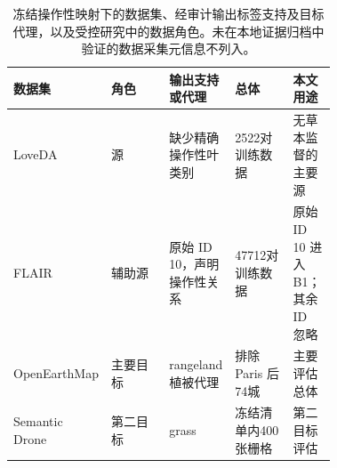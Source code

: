 \begin{table}[H]
\centering
\caption{冻结操作性映射下的数据集、经审计输出标签支持及目标代理，以及受控研究中的数据角色。未在本地证据归档中验证的数据采集元信息不列入。}
\label{tab:datasets}
\small
\renewcommand{\arraystretch}{1.12}
\setlength{\tabcolsep}{3pt}
\begin{tabularx}{\linewidth}{@{}>{\raggedright\arraybackslash}p{0.21\linewidth}>{\raggedright\arraybackslash}p{0.18\linewidth}>{\raggedright\arraybackslash}p{0.15\linewidth}>{\raggedright\arraybackslash}p{0.18\linewidth}>{\raggedright\arraybackslash}X@{}}
\toprule
数据集 & 角色 & 输出支持或代理 & 总体 & 本文用途 \\
\midrule
LoveDA & 源 & 缺少精确操作性叶类别 & 2522对训练数据 & 无草本监督的主要源 \\
FLAIR & 辅助源 & 原始 ID 10，声明操作性关系 & 47712对训练数据 & 原始 ID 10 进入 B1；其余 ID 忽略 \\
OpenEarthMap & 主要目标 & rangeland 植被代理 & 排除 Paris 后74城 & 主要评估总体 \\
Semantic Drone & 第二目标 & grass & 冻结清单内400张栅格 & 第二目标评估 \\
\bottomrule
\end{tabularx}
\end{table}
